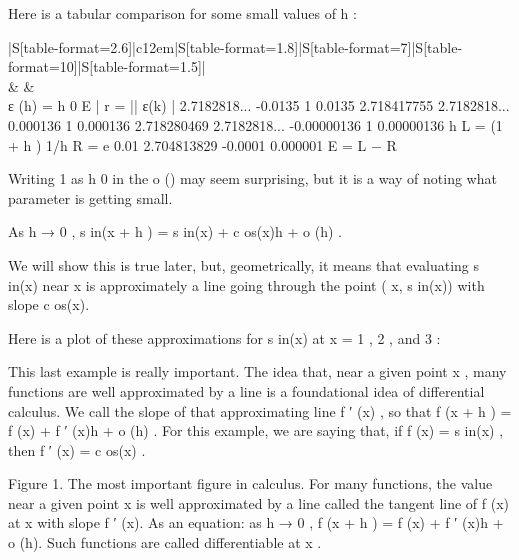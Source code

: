 Here is a tabular comparison for some small values of  h :  
 
\begin{table}
\caption{$2k^3 + 5 k^2 - 7 k + 3$ vs. $2k^3$.}
\label{tab:basic2}
\begin{tabular}{|S[table-format=2.6]|c{12em}|S[table-format=1.8]|S[table-format=7]|S[table-format=10]|S[table-format=1.5]|}
 \\
 & 
 &
 \\
\hline
ε (h) = h 0   E |  
r = || ε(k)
|
2.7182818...  -0.0135  1  0.0135 
2.718417755  2.7182818...  0.000136  1  0.000136 
2.718280469  2.7182818...  -0.00000136  1  0.00000136 
h   L = (1 + h ) 1/h   R = e  
0.01  2.704813829  -0.0001  0.000001 
E = L − R   
 
Writing 1 as  h 0 in the  o () may seem surprising, but it is a way of noting what parameter is getting  
small.   
 
As  h → 0   ,  s in(x + h ) = s in(x) + c os(x)h + o (h) .    
 
We will show this is true later, but, geometrically, it means that evaluating  s in(x) near  x is  
approximately a line going through the point  ( x, s in(x)) with slope  c os(x).  
 
Here is a plot of these approximations for  s in(x) at  x = 1 , 2 , and  3 :   
 
This last example is really important.  The idea that, near a given point  x ,  many functions  
are well approximated by a line is a foundational idea of differential calculus.  We call the 
slope of that approximating  line  f ′ (x) , so that  f (x + h ) = f (x) + f ′ (x)h + o (h) .  For this example, we  
are saying that, if  f (x) = s in(x) , then  f ′ (x) = c os(x) .  
 
 
Figure 1.  The most important figure in calculus.  For many functions, the value near a given point  x is well approximated by a line called the tangent line of  f (x)  at  x with slope  f ′ (x).     As an  
equation: as  h → 0 ,   f (x + h ) = f (x) + f ′ (x)h + o (h).     Such functions are called differentiable at  x .  
 

\end{tabular}
\end{table}
